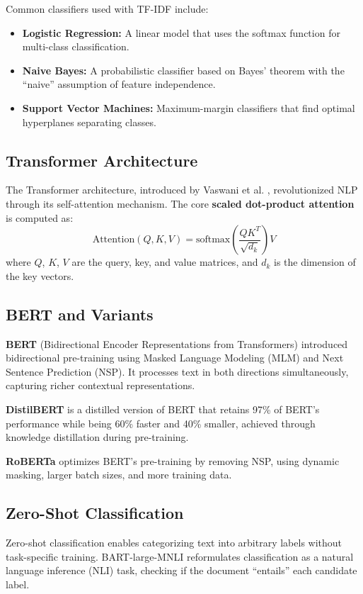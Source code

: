 \documentclass[12pt, a4paper]{article}
\begin{document}
Common classifiers used with TF-IDF include:
\begin{itemize}
    \item \textbf{Logistic Regression:} A linear model that uses the softmax function for multi-class classification.
    \item \textbf{Naive Bayes:} A probabilistic classifier based on Bayes' theorem with the ``naive'' assumption of feature independence.
    \item \textbf{Support Vector Machines:} Maximum-margin classifiers that find optimal hyperplanes separating classes.
\end{itemize}

\subsection{Transformer Architecture}
The Transformer architecture, introduced by Vaswani et al. \cite{vaswani2017attention}, revolutionized NLP through its self-attention mechanism. The core \textbf{scaled dot-product attention} is computed as:
\begin{equation}
    \text{Attention}(Q, K, V) = \text{softmax}\left(\frac{QK^T}{\sqrt{d_k}}\right)V
\end{equation}
where $Q$, $K$, $V$ are the query, key, and value matrices, and $d_k$ is the dimension of the key vectors.

\subsection{BERT and Variants}
\textbf{BERT} (Bidirectional Encoder Representations from Transformers) \cite{devlin2019bert} introduced bidirectional pre-training using Masked Language Modeling (MLM) and Next Sentence Prediction (NSP). It processes text in both directions simultaneously, capturing richer contextual representations.

\textbf{DistilBERT} \cite{sanh2019distilbert} is a distilled version of BERT that retains 97\% of BERT's performance while being 60\% faster and 40\% smaller, achieved through knowledge distillation during pre-training.

\textbf{RoBERTa} \cite{liu2019roberta} optimizes BERT's pre-training by removing NSP, using dynamic masking, larger batch sizes, and more training data.

\subsection{Zero-Shot Classification}
Zero-shot classification enables categorizing text into arbitrary labels without task-specific training. BART-large-MNLI \cite{lewis2020bart} reformulates classification as a natural language inference (NLI) task, checking if the document ``entails'' each candidate label.
\end{document}
